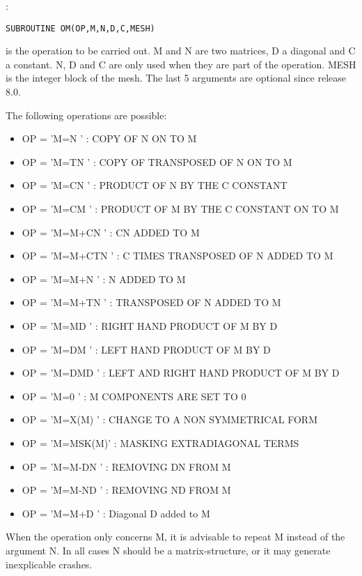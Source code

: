 :
\begin{lstlisting}[language=TelFortran]
SUBROUTINE OM(OP,M,N,D,C,MESH)
\end{lstlisting}

 is the operation to be carried out. M and N are two matrices, D a diagonal
and C a constant. N, D and C are only used when they are part of the operation.
MESH is the integer block of the mesh.
The last 5 arguments are optional since release 8.0.

The following operations are possible:
\begin{itemize}
  \item OP = 'M=N     ' : COPY OF N ON TO M
  \item OP = 'M=TN    ' : COPY OF TRANSPOSED OF N ON TO M
  \item OP = 'M=CN    ' : PRODUCT OF N BY THE C CONSTANT
  \item OP = 'M=CM    ' : PRODUCT OF M BY THE C CONSTANT ON TO M
  \item OP = 'M=M+CN  ' : CN ADDED TO M
  \item OP = 'M=M+CTN ' : C TIMES TRANSPOSED OF N ADDED TO M
  \item OP = 'M=M+N   ' : N ADDED TO M
  \item OP = 'M=M+TN  ' : TRANSPOSED OF N ADDED TO M
  \item OP = 'M=MD    ' : RIGHT HAND PRODUCT OF M BY D
  \item OP = 'M=DM    ' : LEFT HAND PRODUCT OF M BY D
  \item OP = 'M=DMD   ' : LEFT AND RIGHT HAND PRODUCT OF M BY D
  \item OP = 'M=0     ' : M COMPONENTS ARE SET TO 0
  \item OP = 'M=X(M)  ' : CHANGE TO A NON SYMMETRICAL FORM
  \item OP = 'M=MSK(M)' : MASKING EXTRADIAGONAL TERMS
  \item OP = 'M=M-DN  ' : REMOVING DN FROM M
  \item OP = 'M=M-ND  ' : REMOVING ND FROM M
  \item OP = 'M=M+D   ' : Diagonal D added to M
\end{itemize}

When the operation only concerns M, it is advisable to repeat M instead of the
argument N. In all cases N should be a matrix-structure, or it may generate
inexplicable crashes.

